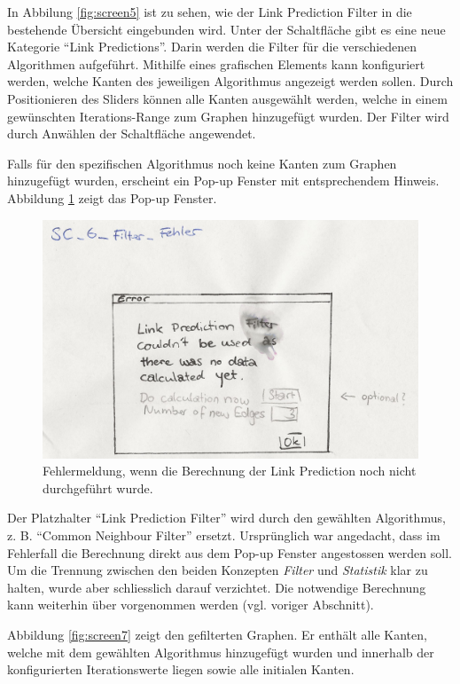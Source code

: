 In Abbilung \ref{fig:screen5} ist zu sehen, wie der Link Prediction Filter in die bestehende Übersicht eingebunden wird.
Unter der Schaltfläche  gibt es eine neue Kategorie ``Link Predictions''.
Darin werden die Filter für die verschiedenen Algorithmen aufgeführt.
Mithilfe eines grafischen Elements kann konfiguriert werden, welche Kanten des jeweiligen Algorithmus angezeigt werden sollen.
Durch Positionieren des Sliders können alle Kanten ausgewählt werden, welche in einem gewünschten Iterations-Range zum Graphen hinzugefügt wurden.
Der Filter wird durch Anwählen der Schaltfläche  angewendet.

Falls für den spezifischen Algorithmus noch keine Kanten zum Graphen hinzugefügt wurden, erscheint ein Pop-up Fenster mit entsprechendem Hinweis.
Abbildung \ref{fig:screen6} zeigt das Pop-up Fenster.

\begin{figure}
    \includegraphics[width=\linewidth]{resources/SC-6.png}
    \caption{Fehlermeldung, wenn die Berechnung der Link Prediction noch nicht durchgeführt wurde.}
    \label{fig:screen6}
\end{figure}

Der Platzhalter ``Link Prediction Filter'' wird durch den gewählten Algorithmus, z. B. ``Common Neighbour Filter'' ersetzt.
Ursprünglich war angedacht, dass im Fehlerfall die Berechnung direkt aus dem Pop-up Fenster angestossen werden soll.
Um die Trennung zwischen den beiden Konzepten \textit{Filter} und \textit{Statistik} klar zu halten, wurde aber schliesslich darauf verzichtet.
Die notwendige Berechnung kann weiterhin über  vorgenommen werden (vgl. voriger Abschnitt).

Abbildung \ref{fig:screen7} zeigt den gefilterten Graphen. Er enthält alle Kanten, welche mit dem gewählten Algorithmus hinzugefügt wurden und
innerhalb der konfigurierten Iterationswerte liegen sowie alle initialen Kanten.


